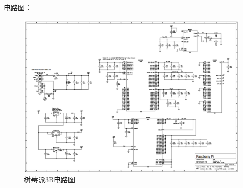 \documentclass{ctexart}
\begin{document}
电路图：
\begin{figure}[H]
\centering
    \includegraphics[width = \textwidth]{036}
    \caption{树莓派3B电路图}\par
\end{figure}
\end{document}
